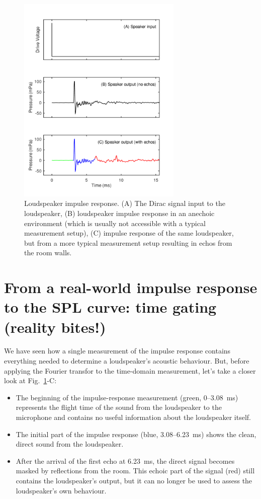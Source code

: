 \documentclass[12pt,a4paper]{article}
\providecommand{\figlabel}[1]{\label{fig:#1}}
\providecommand{\figr}[1]{Fig.~\ref{fig:#1}}
\begin{document}
\begin{figure}[tbp]
  \begin{center}
    \includegraphics[width=0.7\textwidth]{FIGURE1}
    \caption{Loudspeaker impulse response. (A) The Dirac signal input to the loudspeaker, (B) loudspeaker impulse response in an anechoic environment (which is usually not accessible with a typical measurement setup), (C) impulse response of the same loudspeaker, but from a more typical measurement setup resulting in echos from the room walls.}
    \figlabel{FIGURE1}
  \end{center}
\end{figure}

\section{From a real-world impulse response to the SPL curve: time gating (reality bites!)}

We have seen how a single measurement of the impulse response contains everything needed to determine a loudspeaker’s acoustic behaviour.
But, before applying the Fourier transfor to the time-domain measurement, let's take a closer look at \mbox{\figr{FIGURE1}-C}:
\begin{itemize}
\item The beginning of the impulse-response measurement (green, 0--\SI{3.08}{ms}) represents the flight time of the sound from the loudspeaker to the microphone and contains no useful information about the loudspeaker itself.
\item The initial part of the impulse response (blue, 3.08--\SI{6.23}{ms}) shows the clean, direct sound from the loudspeaker.
\item After the arrival of the first echo at \SI{6.23}{ms}, the direct signal becomes masked by reflections from the room.
This echoic part of the signal (red) still contains the loudspeaker’s output, but it can no longer be used to assess the loudspeaker’s own behaviour.
\end{itemize}
\end{document}
